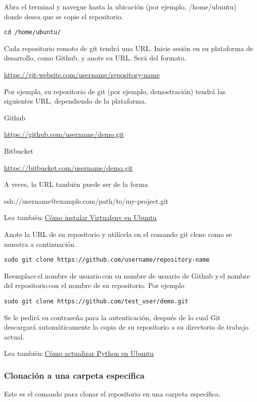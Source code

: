 \documentclass[
  a2paper,
]{article}
\begin{document}
Abra el terminal y navegue hasta la ubicación (por ejemplo,
/home/ubuntu) donde desea que se copie el repositorio.

\texttt{cd\ /home/ubuntu/}

Cada repositorio remoto de git tendrá una URL. Inicie sesión en su
plataforma de desarrollo, como Github, y anote su URL. Será del formato.

\url{https://git-website.com/username/repository-name}

Por ejemplo, su repositorio de git (por ejemplo, demostración) tendrá
las siguientes URL, dependiendo de la plataforma.

Github

\url{https://github.com/username/demo.git}

Bitbucket

\url{https://bitbucket.com/username/demo.git}

A veces, la URL también puede ser de la forma

ssh://username@example.com/path/to/my-project.git\,~

Lea
también:\,\href{https://fedingo.com/how-to-install-virtualenv-in-ubuntu/}{Cómo
instalar Virtualenv en Ubuntu}

Anote la URL de su repositorio y utilícela en el comando git clone como
se muestra a continuación.

\texttt{sudo\ git\ clone~https://github.com/username/repository-name}

Reemplace\,el nombre de usuario\,con su nombre de usuario de Github
y\,el nombre del repositorio\,con el nombre de su repositorio. Por
ejemplo

\texttt{sudo\ git\ clone~https://github.com/test\_user/demo.git}

Se le pedirá su contraseña para la autenticación, después de lo cual Git
descargará automáticamente la copia de su repositorio a su directorio de
trabajo actual.

Lea
también:\,\href{https://fedingo.com/how-to-upgrade-python-in-ubuntu/}{Cómo
actualizar Python en Ubuntu}

\hypertarget{clonaciuxf3n-a-una-carpeta-especuxedfica}{%
\subsubsection{Clonación a una carpeta
específica}\label{clonaciuxf3n-a-una-carpeta-especuxedfica}}

Este es el comando para clonar el repositorio en una carpeta específica.
\end{document}
